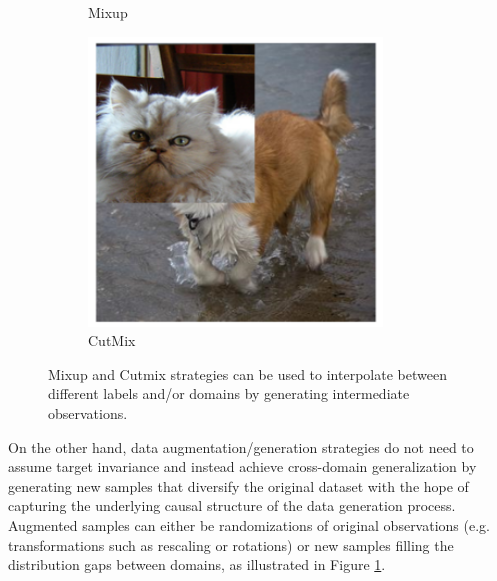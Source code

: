 \begin{figure}[H]
\begin{subfigure}[b]{0.2\textwidth}
        \caption{Mixup 
        \cite{zhangMixupEmpiricalRisk2018}
        }
    \end{subfigure}
    \hspace{1cm}
    \begin{subfigure}[b]{0.2\textwidth}
        \centering
        \includegraphics[width=\textwidth]{img/introduction/da_cutmix.png}
        \caption{CutMix
        \cite{yunCutMixRegularizationStrategy2019}
        }
    \end{subfigure}
       \caption{
        Mixup and Cutmix strategies can be used to interpolate
        between different labels and/or domains
        by generating intermediate observations.
        \cite{yunCutMixRegularizationStrategy2019}
        }
       \label{fig:data_augmentation}
\end{figure}

On the other hand, data augmentation/generation strategies 
do not need to assume target invariance and instead 
achieve cross-domain generalization by generating new samples that
diversify the original dataset with the hope of capturing 
the underlying causal structure of the data generation process. Augmented samples
can either be randomizations of original observations (e.g. transformations
such as rescaling or rotations) or new samples filling the distribution
gaps between domains, as illustrated in Figure \ref{fig:data_augmentation}. \\


